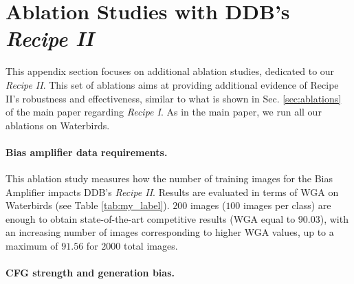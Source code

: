 \section{Ablation Studies with DDB's \textit{Recipe II}}
\label{supsec:abl_recipe2}
This appendix section focuses on additional ablation studies, dedicated to our \textit{Recipe II}. This set of ablations aims at providing additional evidence of Recipe II's robustness and effectiveness, similar to what is shown in Sec. \ref{sec:ablations} of the main paper regarding \textit{Recipe I}. As in the main paper, we run all our ablations on Waterbirds.
\paragraph{Bias amplifier data requirements. }
\begin{table}[ht]
    \centering
    \caption{Ablation on the number of training images for the Bias Amplifier, in terms of WGA on Waterbirds, when using DDB's \textit{Recipe II}.}
    \label{tab:num-images-recipe2}
\end{table}
This ablation study measures how the number of training images for the Bias Amplifier impacts DDB's \textit{Recipe II}. Results are evaluated in terms of WGA on Waterbirds (see Table \ref{tab:my_label}). $200$ images ($100$ images per class) are enough to obtain state-of-the-art competitive results (WGA equal to $90.03$), with an increasing number of images corresponding to higher WGA values, up to a maximum of $91.56$ for $2000$ total images.  
\paragraph{CFG strength and generation bias. }
\begin{table}[ht]
    \centering
    \caption{Impact of guidance strength $w$ on the final WGA on Waterbirds, when using DDB's \textit{Recipe II}.}
    \label{tab:guidance_strength_recipe_two}
\end{table}

